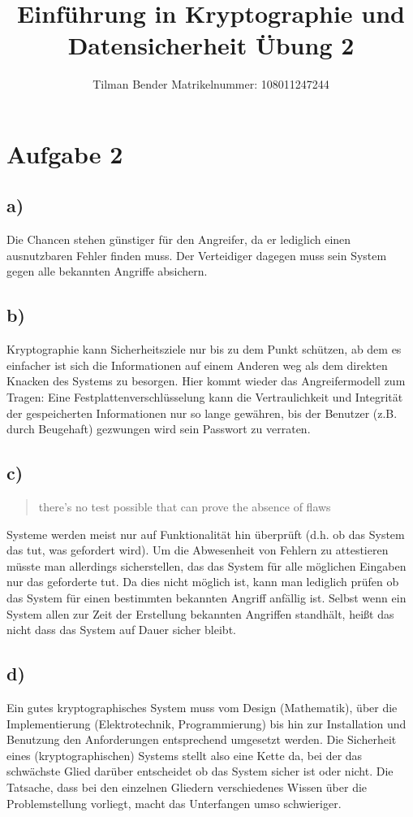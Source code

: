 \documentclass[10pt,a4paper]{article}
\author{Tilman Bender   Matrikelnummer: 108011247244\\}
\title{Einführung in Kryptographie und Datensicherheit Übung 2}
\begin{document}
\maketitle

\section*{Aufgabe 2}
\subsection*{a)} Die Chancen stehen günstiger für den Angreifer, da er lediglich einen ausnutzbaren Fehler finden muss. Der Verteidiger dagegen muss sein System gegen alle bekannten Angriffe absichern.
\subsection*{b)} Kryptographie kann Sicherheitsziele nur  bis zu dem Punkt schützen, ab dem es einfacher ist sich die Informationen auf einem Anderen weg als dem direkten Knacken des Systems zu besorgen. Hier kommt wieder das Angreifermodell zum Tragen: Eine Festplattenverschlüsselung kann die Vertraulichkeit und Integrität der gespeicherten Informationen nur so lange gewähren, bis der Benutzer (z.B. durch Beugehaft) gezwungen wird sein Passwort zu verraten.
\subsection*{c)} 
\begin{quote}
there’s no test possible that can prove the absence of flaws
\end{quote}
Systeme werden meist nur auf Funktionalität hin überprüft (d.h. ob das System das tut, was gefordert wird). Um die Abwesenheit von Fehlern zu attestieren müsste man allerdings sicherstellen, das das System für alle möglichen Eingaben nur das geforderte tut. Da dies nicht möglich ist, kann man lediglich prüfen ob das System für einen bestimmten bekannten Angriff anfällig ist. Selbst wenn ein System allen zur Zeit der Erstellung bekannten Angriffen standhält, heißt das nicht
dass das System auf Dauer sicher bleibt.
\subsection*{d)}
Ein gutes kryptographisches System muss vom Design (Mathematik), über die Implementierung (Elektrotechnik, Programmierung) bis hin zur Installation und Benutzung den Anforderungen entsprechend umgesetzt werden. Die Sicherheit eines (kryptographischen) Systems stellt also eine Kette da, bei der das schwächste Glied darüber entscheidet ob das System sicher ist oder nicht. Die Tatsache, dass bei den einzelnen Gliedern verschiedenes Wissen über die Problemstellung vorliegt, macht das Unterfangen umso schwieriger. 
\end{document}

